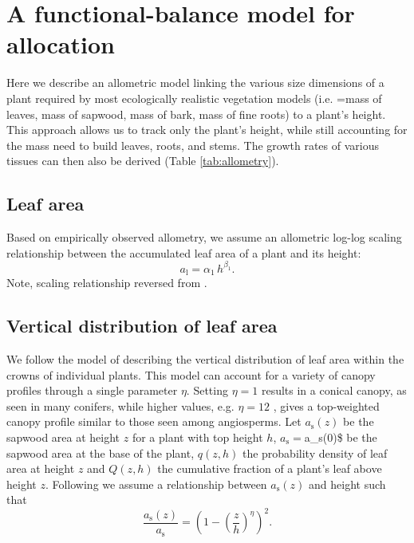 \documentclass[10pt,twoside]{article}
\begin{document}
\section{A functional-balance model for
allocation}\label{a-functional-balance-model-for-allocation}

Here we describe an allometric model linking the various size dimensions
of a plant required by most ecologically realistic vegetation models
(i.e. =mass of leaves, mass of sapwood, mass of bark, mass of fine
roots) to a plant's height. This approach allows us to track only the
plant's height, while still accounting for the mass need to build
leaves, roots, and stems. The growth rates of various tissues can then
also be derived (Table \ref{tab:allometry}).

\subsection{Leaf area}\label{leaf-area}

Based on empirically observed allometry, we assume an allometric log-log
scaling relationship between the accumulated leaf area of a plant and
its height:
\begin{equation}\label{eq:ha}
a_\textrm{l}=\alpha_1 \, h^{\beta_1}.
\end{equation}
Note, scaling relationship reversed from \citep{Falster-2011}.

\subsection{Vertical distribution of leaf
area}\label{vertical-distribution-of-leaf-area}

We follow the model of \citet{Yokozawa-1995} describing the vertical
distribution of leaf area within the crowns of individual plants. This
model can account for a variety of canopy profiles through a single
parameter \(\eta\). Setting \(\eta=1\) results in a conical canopy, as
seen in many conifers, while higher values, e.g. \(\eta=12\) , gives a
top-weighted canopy profile similar to those seen among angiosperms. Let
\(a_\textrm{s}(z)\) be the sapwood area at height \(z\) for a plant with
top height \(h\), \(a_\textrm{s} =\)a\_\textrm{s}(0)\$ be the sapwood
area at the base of the plant, \(q(z,h)\) the probability density of
leaf area at height \(z\) and \(Q(z,h)\) the cumulative fraction of a
plant's leaf above height \(z\). Following \citet{Yokozawa-1995} we
assume a relationship between \(a_\textrm{s}(z)\) and height such that
\begin{equation}\label{eq:crown1}
\frac{a_\textrm{s}(z)}{a_\textrm{s}}= \left(1-\left(\frac{z}{h}\right)^\eta\right)^2.
\end{equation}
\end{document}
